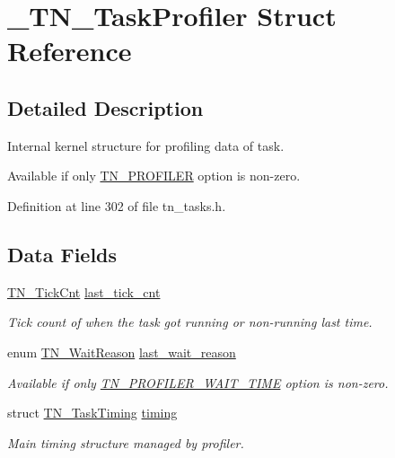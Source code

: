 \hypertarget{struct__TN__TaskProfiler}{\section{\+\_\+\+T\+N\+\_\+\+Task\+Profiler Struct Reference}
\label{struct__TN__TaskProfiler}
}


\subsection{Detailed Description}
Internal kernel structure for profiling data of task. 

Available if only {\ttfamily \hyperlink{tn__cfg__default_8h_a49a546b18cc1f75b51d4cf8b290634dd}{T\+N\+\_\+\+P\+R\+O\+F\+I\+L\+E\+R}} option is non-\/zero. 

Definition at line 302 of file tn\+\_\+tasks.\+h.

\subsection*{Data Fields}
\begin{DoxyCompactItemize}
\item 
\hypertarget{struct__TN__TaskProfiler_af7e85444a89aa6d17c4eb9115fdea4fb}{\hyperlink{tn__common_8h_ac885b63d00c063de61cdbd80bf26d8aa}{T\+N\+\_\+\+Tick\+Cnt} \hyperlink{struct__TN__TaskProfiler_af7e85444a89aa6d17c4eb9115fdea4fb}{last\+\_\+tick\+\_\+cnt}}\label{struct__TN__TaskProfiler_af7e85444a89aa6d17c4eb9115fdea4fb}

\begin{DoxyCompactList}\small\item\em Tick count of when the task got running or non-\/running last time. \end{DoxyCompactList}\item 
enum \hyperlink{tn__tasks_8h_a343b0332013c15d6e878c2f60ed2c9b7}{T\+N\+\_\+\+Wait\+Reason} \hyperlink{struct__TN__TaskProfiler_aa587d29f8b4a5252547dc3144735ea55}{last\+\_\+wait\+\_\+reason}
\begin{DoxyCompactList}\small\item\em Available if only {\ttfamily \hyperlink{tn__cfg__default_8h_a1c04db5457adb54f7cc38d42b29a5ad7}{T\+N\+\_\+\+P\+R\+O\+F\+I\+L\+E\+R\+\_\+\+W\+A\+I\+T\+\_\+\+T\+I\+M\+E}} option is non-\/zero. \end{DoxyCompactList}\item 
struct \hyperlink{structTN__TaskTiming}{T\+N\+\_\+\+Task\+Timing} \hyperlink{struct__TN__TaskProfiler_a49e7b961e080414f407f5c52f9688ed5}{timing}
\begin{DoxyCompactList}\small\item\em Main timing structure managed by profiler. \end{DoxyCompactList}\end{DoxyCompactItemize}


